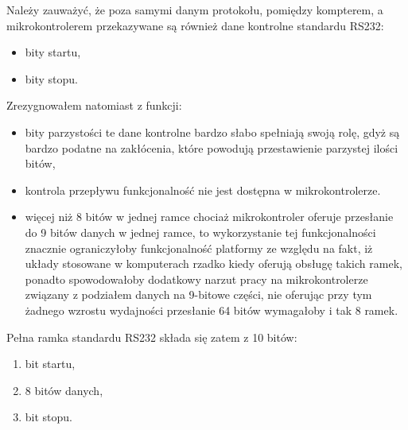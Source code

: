 Należy zauważyć, że poza samymi danym protokołu, pomiędzy kompterem, a mikrokontrolerem przekazywane są również dane kontrolne standardu RS232:
\begin{itemize}
  \item bity startu,
  \item bity stopu.
\end{itemize}

Zrezygnowałem natomiast z funkcji:
\begin{itemize}
 \item bity parzystości \ppauza te dane kontrolne bardzo słabo spełniają swoją rolę, gdyż są bardzo podatne na zakłócenia, które powodują przestawienie parzystej ilości bitów,
 \item kontrola przepływu \ppauza funkcjonalność nie jest dostępna w mikrokontrolerze.
 \item więcej niż 8 bitów w jednej ramce \ppauza chociaż mikrokontroler oferuje przesłanie do 9 bitów danych w jednej ramce, to wykorzystanie tej funkcjonalności znacznie ograniczyłoby funkcjonalność platformy ze względu na fakt, iż układy stosowane w komputerach rzadko kiedy oferują obsługę takich ramek, ponadto spowodowałoby dodatkowy narzut pracy na mikrokontrolerze związany z podziałem danych na 9-bitowe części, nie oferując przy tym żadnego wzrostu wydajności \ppauza przesłanie 64 bitów wymagałoby i tak 8 ramek.
\end{itemize}

Pełna ramka standardu RS232 składa się zatem z 10 bitów:
\begin{enumerate}
 \item bit startu,
 \item 8 bitów danych,
 \item bit stopu.
\end{enumerate}